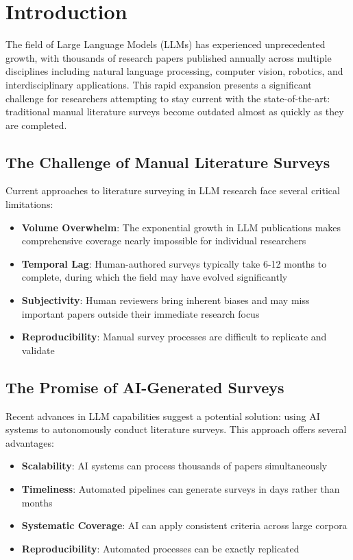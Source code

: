 \section{Introduction}

The field of Large Language Models (LLMs) has experienced unprecedented growth, with thousands of research papers published annually across multiple disciplines including natural language processing, computer vision, robotics, and interdisciplinary applications. This rapid expansion presents a significant challenge for researchers attempting to stay current with the state-of-the-art: traditional manual literature surveys become outdated almost as quickly as they are completed.

\subsection{The Challenge of Manual Literature Surveys}

Current approaches to literature surveying in LLM research face several critical limitations:

\begin{itemize}
    \item \textbf{Volume Overwhelm}: The exponential growth in LLM publications makes comprehensive coverage nearly impossible for individual researchers
    \item \textbf{Temporal Lag}: Human-authored surveys typically take 6-12 months to complete, during which the field may have evolved significantly
    \item \textbf{Subjectivity}: Human reviewers bring inherent biases and may miss important papers outside their immediate research focus
    \item \textbf{Reproducibility}: Manual survey processes are difficult to replicate and validate
\end{itemize}

\subsection{The Promise of AI-Generated Surveys}

Recent advances in LLM capabilities suggest a potential solution: using AI systems to autonomously conduct literature surveys. This approach offers several advantages:

\begin{itemize}
    \item \textbf{Scalability}: AI systems can process thousands of papers simultaneously
    \item \textbf{Timeliness}: Automated pipelines can generate surveys in days rather than months
    \item \textbf{Systematic Coverage}: AI can apply consistent criteria across large corpora
    \item \textbf{Reproducibility}: Automated processes can be exactly replicated
\end{itemize}


